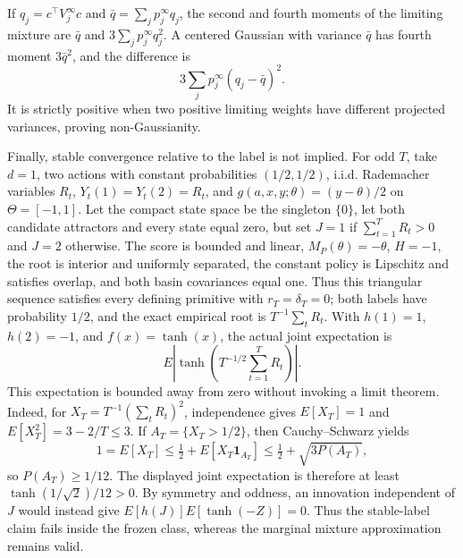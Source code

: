 If \(q_j=c^\top V_j^\infty c\) and \(\bar q=\sum_jp_j^\infty q_j\), the second and fourth moments of the limiting mixture are \(\bar q\) and \(3\sum_jp_j^\infty q_j^2\). A centered Gaussian with variance \(\bar q\) has fourth moment \(3\bar q^2\), and the difference is
\[
 3\sum_jp_j^\infty(q_j-\bar q)^2.
\]
It is strictly positive when two positive limiting weights have different projected variances, proving non-Gaussianity.

Finally, stable convergence relative to the label is not implied. For odd \(T\), take \(d=1\), two actions with constant probabilities \((1/2,1/2)\), i.i.d. Rademacher variables \(R_t\), \(Y_t(1)=Y_t(2)=R_t\), and \(g(a,x,y;\theta)=(y-\theta)/2\) on \(\Theta=[-1,1]\). Let the compact state space be the singleton \(\{0\}\), let both candidate attractors and every state equal zero, but set \(J=1\) if \(\sum_{t=1}^TR_t>0\) and \(J=2\) otherwise. The score is bounded and linear, \(M_P(\theta)=-\theta\), \(H=-1\), the root is interior and uniformly separated, the constant policy is Lipschitz and satisfies overlap, and both basin covariances equal one. Thus this triangular sequence satisfies every defining primitive with \(r_T=\delta_T=0\); both labels have probability \(1/2\), and the exact empirical root is \(T^{-1}\sum_tR_t\). With \(h(1)=1\), \(h(2)=-1\), and \(f(x)=\tanh(x)\), the actual joint expectation is
\[
 E\left|\tanh\left(T^{-1/2}\sum_{t=1}^TR_t\right)\right|.
\]
This expectation is bounded away from zero without invoking a limit theorem. Indeed, for \(X_T=T^{-1}(\sum_tR_t)^2\), independence gives \(E[X_T]=1\) and \(E[X_T^2]=3-2/T\le3\). If \(A_T=\{X_T>1/2\}\), then Cauchy--Schwarz yields
\[
 1=E[X_T]\le\tfrac12+E[X_T\mathbf 1_{A_T}]
 \le\tfrac12+\sqrt{3P(A_T)},
\]
so \(P(A_T)\ge1/12\). The displayed joint expectation is therefore at least \(\tanh(1/\sqrt2)/12>0\). By symmetry and oddness, an innovation independent of \(J\) would instead give \(E[h(J)]E[\tanh(-Z)]=0\). Thus the stable-label claim fails inside the frozen class, whereas the marginal mixture approximation remains valid.